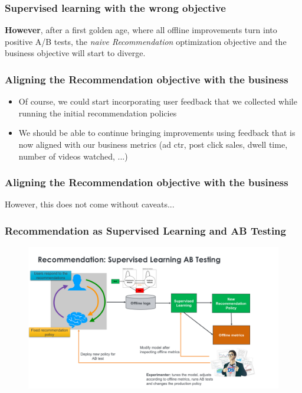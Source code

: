   
  \begin{frame}
    \frametitle{Supervised learning with the wrong objective}
  
  \textbf{However}, after a first golden age, where all offline improvements turn into positive A/B tests, the \emph{naive Recommendation} optimization objective and the business objective will start to diverge.
  
  \end{frame}
  
  
  \begin{frame}
    \frametitle{Aligning the Recommendation objective with the business}
  
  \begin{itemize}
  \item Of course, we could start incorporating user feedback that we collected while running the initial recommendation policies  
  \item We should be able to continue bringing improvements using feedback that is now aligned with our business metrics (ad ctr, post click sales, dwell time, number of videos watched, ...)
  \end{itemize}
  
  \end{frame}
  
  
  \begin{frame}
    \frametitle{Aligning the Recommendation objective with the business}
  
    However, this does not come without caveats...
  
  \end{frame}
  
  
  \begin{frame}
    \frametitle{Recommendation as Supervised Learning and AB Testing}
   
   
     \begin{figure}[h!]
       \includegraphics[scale=0.3]{images/recoasabtesting0.png}
         \centering
         \label{motex1}
     \end{figure}
       
   \end{frame}
  
